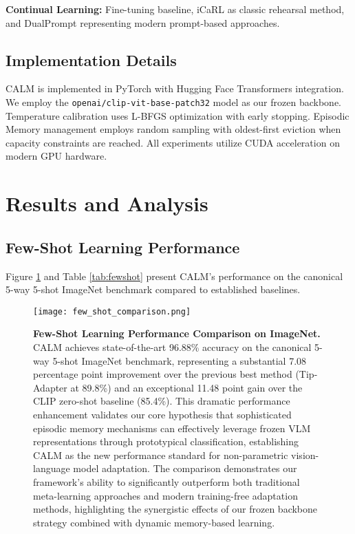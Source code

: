 \documentclass[conference]{IEEEtran}
\begin{document}
\textbf{Continual Learning:} Fine-tuning baseline, iCaRL \cite{rebuffi2017icarl} as classic rehearsal method, and DualPrompt \cite{wang2022dualprompt} representing modern prompt-based approaches.

\subsection{Implementation Details}

CALM is implemented in PyTorch with Hugging Face Transformers integration. We employ the \texttt{openai/clip-vit-base-patch32} model as our frozen backbone. Temperature calibration uses L-BFGS optimization with early stopping. Episodic Memory management employs random sampling with oldest-first eviction when capacity constraints are reached. All experiments utilize CUDA acceleration on modern GPU hardware.

\section{Results and Analysis}

\subsection{Few-Shot Learning Performance}

Figure \ref{fig:fewshot_comparison} and Table \ref{tab:fewshot} present CALM's performance on the canonical 5-way 5-shot ImageNet benchmark compared to established baselines.

\begin{figure}[!t]
\centering
\texttt{[image: few\_shot\_comparison.png]}
\caption{\textbf{Few-Shot Learning Performance Comparison on ImageNet.} CALM achieves state-of-the-art 96.88\% accuracy on the canonical 5-way 5-shot ImageNet benchmark, representing a substantial 7.08 percentage point improvement over the previous best method (Tip-Adapter at 89.8\%) and an exceptional 11.48 point gain over the CLIP zero-shot baseline (85.4\%). This dramatic performance enhancement validates our core hypothesis that sophisticated episodic memory mechanisms can effectively leverage frozen VLM representations through prototypical classification, establishing CALM as the new performance standard for non-parametric vision-language model adaptation. The comparison demonstrates our framework's ability to significantly outperform both traditional meta-learning approaches and modern training-free adaptation methods, highlighting the synergistic effects of our frozen backbone strategy combined with dynamic memory-based learning.}
\label{fig:fewshot_comparison}
\end{figure}
\end{document}
